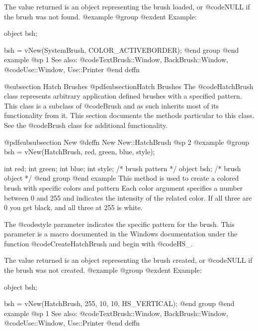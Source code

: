 The value returned is an object representing the brush loaded, or
@code{NULL} if the brush was not found.
@example
@group
@exdent Example:

object  bsh;

bsh = vNew(SystemBrush, COLOR_ACTIVEBORDER);
@end group
@end example
@sp 1
See also:  @code{TextBrush::Window, BackBrush::Window,}
        @code{Use::Window, Use::Printer}
@end deffn










@subsection Hatch Brushes
@pdfsubsection{Hatch Brushes}
The @code{HatchBrush} class represents arbitrary application defined
brushes with a specified pattern.  This class is a subclass of
@code{Brush} and as such inherits most of its functionality from it.
This section documents the methods particular to this class.  See the
@code{Brush} class for additional functionality.






@pdfsubsubsection {New}
@deffn {New} New::HatchBrush
@sp 2
@example
@group
bsh = vNew(HatchBrush, red, green, blue, style);

int     red;
int     green;
int     blue;
int     style;  /*  brush pattern  */
object  bsh;    /*  brush object   */
@end group
@end example
This method is used to create a colored brush with specific colors and
pattern Each color argument specifies a number between 0 and 255 and
indicates the intensity of the related color.  If all three are 0 you
get black, and all three at 255 is white.

The @code{style} parameter indicates the specific pattern for the brush.
This parameter is a macro documented in the Windows documentation under
the function @code{CreateHatchBrush} and begin with @code{HS_}.

The value returned is an object representing the brush created, or
@code{NULL} if the brush was not created.
@example
@group
@exdent Example:

object  bsh;

bsh = vNew(HatchBrush, 255, 10, 10, HS_VERTICAL);
@end group
@end example
@sp 1
See also:  @code{TextBrush::Window, BackBrush::Window,}
        @code{Use::Window, Use::Printer}
@end deffn









